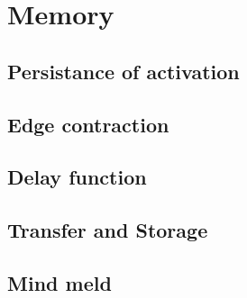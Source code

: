 \chapter{Memory}
\section{Persistance of activation}
\section{Edge contraction}
\section{Delay function}
\section{Transfer and Storage}
\section{Mind meld}
